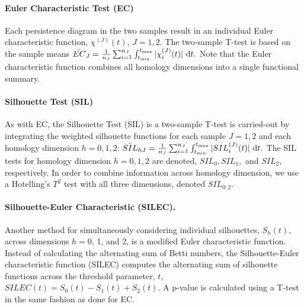 \documentclass[12pt]{article}
\begin{document}
\paragraph{Euler Characteristic Test (EC)}
Each persistence diagram in the two samples result in an individual Euler characteristic function, $\chi^{(J)}(t)$,  $J = 1, 2$. The two-sample T-test is based on the sample means
$
\bar{EC}_J = \frac{1}{n_J}\sum_{i = 1}^{n_J} \int_{t_{\min}}^{t_{\max}} | \chi_i^{(J)}(t) | \textup{ d}t.
$
Note that the Euler characteristic function combines all homology dimensions into a single functional summary.



\paragraph{Silhouette Test (SIL)}
As with EC, the Silhouette Test (SIL) is a two-sample T-test is carried-out by integrating the weighted silhouette functions for each sample $J = 1, 2$ and each homology dimension $h = 0, 1, 2$:  $
\bar{SIL}_{hJ} = \frac{1}{n_J}\sum_{i = 1}^{n_J} \int_{t_{\min}}^{t_{\max}} | SIL_i^{(J)}(t) | \textup{ d}t.$  The SIL tests for homology dimension $h = 0, 1, 2$ are denoted, $SIL_0, SIL_1,$ and $SIL_2$, respectively.
In order to combine information across homology dimension, we use a Hotelling's $T^2$ test with all three dimensions, denoted $SIL_{0:2}$.


\paragraph{Silhouette-Euler Characteristic (SILEC).}
Another method for simultaneously considering individual silhouettes, $S_{h}(t)$, across dimensions $h = 0$, 1, and 2, is a modified Euler characteristic function. Instead of calculating the alternating sum of Betti numbers, the Silhouette-Euler characteristic function (SILEC) computes the alternating sum of silhouette functions across the threshold parameter, $t$, $SILEC(t) =  S_{0}(t) - S_{1}(t) + S_{2}(t)$. A p-value is calculated using a T-test in the same fashion as done for EC.
\end{document}
